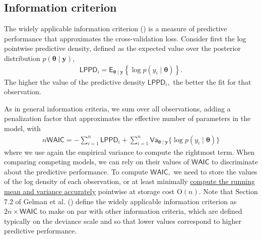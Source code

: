 \documentclass[
  11pt,
  letterpaper,
]{scrbook}
\theoremstyle{definition}
\theoremstyle{plain}
\theoremstyle{plain}
\theoremstyle{definition}
\theoremstyle{definition}
\theoremstyle{remark}
\begin{document}
\subsection{Information criterion}\label{information-criterion}

The widely applicable information criterion
() is a measure of predictive
performance that approximates the cross-validation loss. Consider first
the log pointwise predictive density, defined as the expected value over
the posterior distribution
\(p(\boldsymbol{\theta} \mid \boldsymbol{y}),\) \begin{align*}
\mathsf{LPPD}_i = \mathsf{E}_{\boldsymbol{\theta} \mid \boldsymbol{y}} \left\{ \log p(y_i \mid \boldsymbol{\theta})\right\}.
\end{align*} The higher the value of the predictive density
\(\mathsf{LPPD}_i,\) the better the fit for that observation.

As in general information criteria, we sum over all observations, adding
a penalization factor that approximates the effective number of
parameters in the model, with \begin{align*}
n\mathsf{WAIC} = -\sum_{i=1}^n \mathsf{LPPD}_i + \sum_{i=1}^n \mathsf{Va}_{\boldsymbol{\theta} \mid \boldsymbol{y}}\{\log p(y_i \mid \boldsymbol{\theta})\}
\end{align*} where we use again the empirical variance to compute the
rightmost term. When comparing competing models, we can rely on their
values of \(\mathsf{WAIC}\) to discriminate about the predictive
performance. To compute \(\mathsf{WAIC},\) we need to store the values
of the log density of each observation, or at least minimally
\href{https://www.johndcook.com/blog/standard_deviation/}{compute the
running mean and variance accurately} pointwise at storage cost
\(\mathrm{O}(n).\) Note that Section 7.2 of Gelman et al.
() define the widely applicable
information criterion as \(2n \times \mathsf{WAIC}\) to make on par with
other information criteria, which are defined typically on the deviance
scale and so that lower values correspond to higher predictive
performance.
\end{document}
